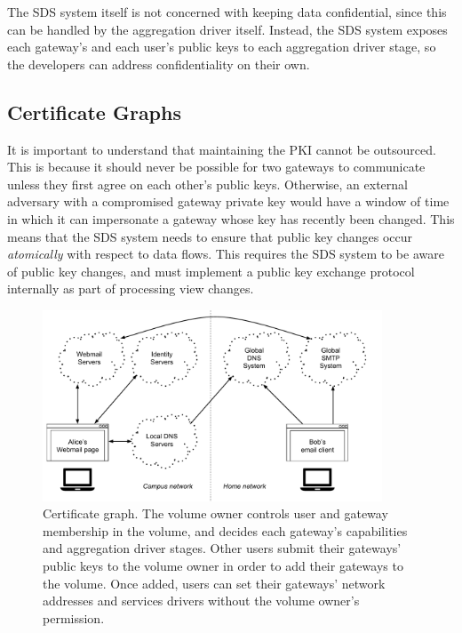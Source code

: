 The SDS system itself is not concerned with keeping data
confidential, since this can be handled by the aggregation driver itself.
Instead, the SDS system exposes each gateway's and each user's public keys to
each aggregation driver stage, so the developers can address confidentiality on their own.

\subsection{Certificate Graphs}

It is important to understand that maintaining the PKI cannot be outsourced.
This is because it should never be possible for two
gateways to communicate unless they first agree on each other's public keys.
Otherwise, an external adversary with a compromised gateway private key
would have a window of time in which it can
impersonate a gateway whose key has recently been changed.  This means that the
SDS system needs to ensure that public key changes occur \emph{atomically} with respect
to data flows.  This requires the SDS system to be aware of public key changes,
and must implement a public key exchange protocol internally as part of
processing view changes.

\begin{figure}[h!]
   \centering
   \includegraphics[width=0.9\textwidth,page=13]{figures/dissertation-figures}
   \caption{Certificate graph.  The volume owner controls user and gateway
   membership in the volume, and decides each gateway's capabilities and
   aggregation driver stages.  Other users submit their gateways' public keys to the 
   volume owner in order to add their gateways to the volume.  Once added,
   users can set their gateways'
   network addresses and services drivers without the volume owner's permission.}
   \label{fig:chap2-certificate-graph}
\end{figure}

